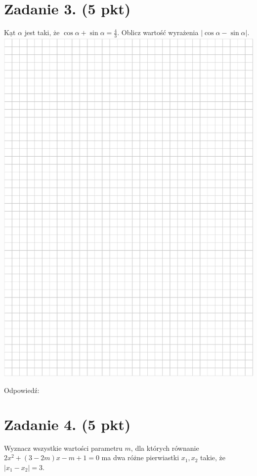 \documentclass[10pt]{article}
\begin{document}
\section*{Zadanie 3. (5 pkt)}
Kạt \(\alpha\) jest taki, że \(\cos \alpha+\sin \alpha=\frac{4}{3}\). Oblicz wartość wyrażenia \(|\cos \alpha-\sin \alpha|\).\\
\includegraphics[max width=\textwidth, center]{2024_11_21_d9af6ed2d610d3f2d2cbg-05}

Odpowiedź:

\section*{Zadanie 4. (5 pkt)}
Wyznacz wszystkie wartości parametru \(m\), dla których równanie \(2 x^{2}+(3-2 m) x-m+1=0\) ma dwa różne pierwiastki \(x_{1}, x_{2}\) takie, że \(\left|x_{1}-x_{2}\right|=3\).
\end{document}
